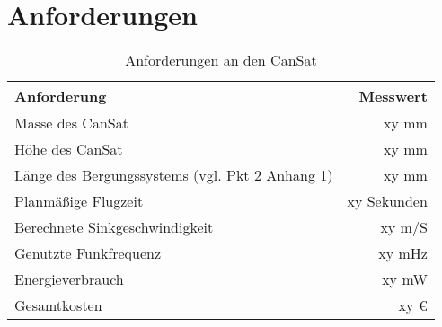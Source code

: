 \section{Anforderungen}
\begin{table}[htbp]
  \centering
  
    \begin{tabular}{l|r}
    \toprule
    \textbf{Anforderung} & \textbf{Messwert}  \\
    \midrule
    Masse des CanSat  & xy mm \\
    Höhe des CanSat	  & xy mm\\
	Länge des Bergungssystems (vgl. Pkt 2 Anhang 1)  & xy mm \\
	Planmäßige Flugzeit  & xy Sekunden \\
    Berechnete Sinkgeschwindigkeit  & xy m/S \\
    Genutzte Funkfrequenz & xy mHz \\
    Energieverbrauch & xy mW \\
    Gesamtkosten & xy \euro \\
    \bottomrule
    \end{tabular}%
    \caption{Anforderungen an den CanSat}
  \label{tab:anforderungen}%
\end{table}%